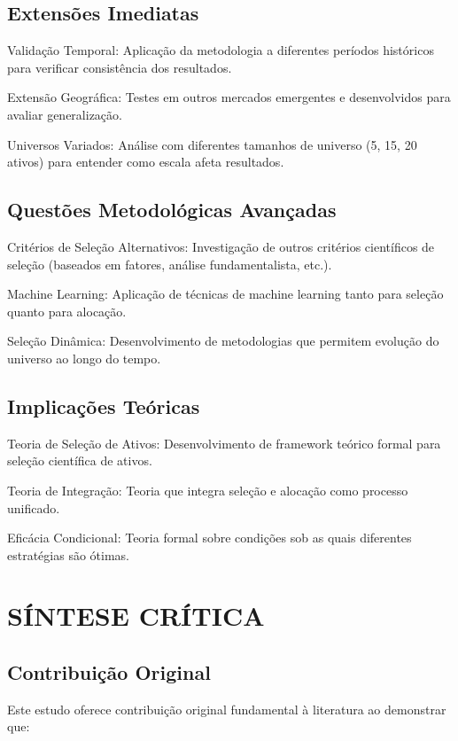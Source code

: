 \subsection{Extensões Imediatas}

Validação Temporal: Aplicação da metodologia a diferentes períodos históricos para verificar consistência dos resultados.

Extensão Geográfica: Testes em outros mercados emergentes e desenvolvidos para avaliar generalização.

Universos Variados: Análise com diferentes tamanhos de universo (5, 15, 20 ativos) para entender como escala afeta resultados.

\subsection{Questões Metodológicas Avançadas}

Critérios de Seleção Alternativos: Investigação de outros critérios científicos de seleção (baseados em fatores, análise fundamentalista, etc.).

Machine Learning: Aplicação de técnicas de machine learning tanto para seleção quanto para alocação.

Seleção Dinâmica: Desenvolvimento de metodologias que permitem evolução do universo ao longo do tempo.

\subsection{Implicações Teóricas}

Teoria de Seleção de Ativos: Desenvolvimento de framework teórico formal para seleção científica de ativos.

Teoria de Integração: Teoria que integra seleção e alocação como processo unificado.

Eficácia Condicional: Teoria formal sobre condições sob as quais diferentes estratégias são ótimas.

\section{SÍNTESE CRÍTICA}

\subsection{Contribuição Original}

Este estudo oferece contribuição original fundamental à literatura ao demonstrar que:

